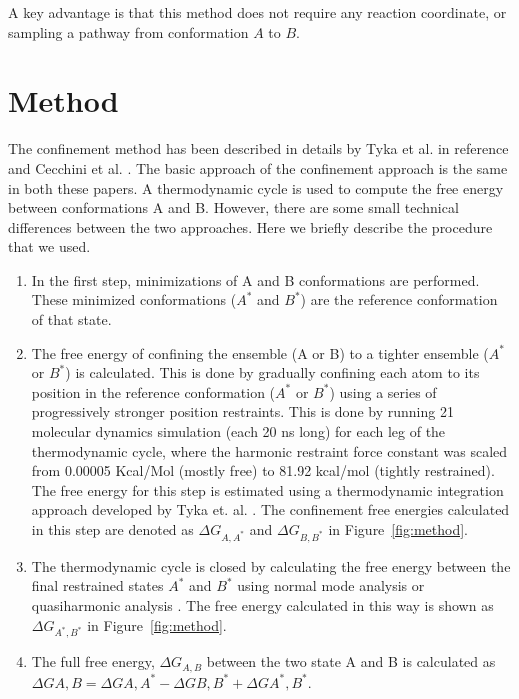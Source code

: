 \documentclass[12pt]{article}
\begin{document}
A key advantage is that this method does not require any reaction coordinate, or sampling a
pathway from conformation $A$ to $B$. 



\section{Method}

The confinement method has been described in details by Tyka et al. in reference \cite{Tyka2006} and
Cecchini et  al. \cite{Cecchini2009}. The basic approach of the confinement approach is the same in
both these papers. A thermodynamic cycle is used to compute the free energy between conformations A
and B. However, there are some small technical differences between the two approaches. Here we briefly
describe the procedure that we used.

\begin{enumerate}

\item  In the first step, minimizations of A and B conformations are performed. These minimized conformations
    ($A^{\ast}$ and $B^{\ast}$) are the reference conformation of that state.

\item The free energy of confining the ensemble (A or B) to a tighter ensemble ($A^\ast$ or $B^\ast$) is calculated.
    This is done by gradually confining each atom to its position in the reference conformation ($A^{\ast}$ or
    $B^{\ast}$) using a series of progressively stronger position restraints. This is done by running 21 molecular
    dynamics simulation (each 20 ns long) for each leg of the thermodynamic cycle, where the harmonic restraint force
    constant was scaled from 0.00005 Kcal/Mol (mostly free) to 81.92 kcal/mol (tightly restrained). The free energy for
    this step is estimated using a thermodynamic integration approach developed by Tyka et. al. \cite{Tyka2006}. The
    confinement free energies calculated in this step are denoted as $\Delta G_{A,A^\ast}$ and $\Delta G_{B,B^\ast}$ in
    Figure~\ref{fig:method}. 

\item The thermodynamic cycle is closed by calculating the free energy between the final restrained states $A^\ast$ and
    $B^\ast$ using normal mode analysis \cite{Brooks1983,Case1994} or quasiharmonic analysis \cite{Karplus1981,Levy1984}. The free energy calculated in this way is shown as
    $\Delta G_{A^\ast,B^\ast}$ in Figure~\ref{fig:method}.

\item  The full free energy, $\Delta G_{A,B}$ between the two state A and B is calculated as
    $\Delta G{A,B} = \Delta G{A,A^\ast} - \Delta G{B,B^\ast} + \Delta G{A^\ast,B^\ast}$.

\end{enumerate}
\end{document}
